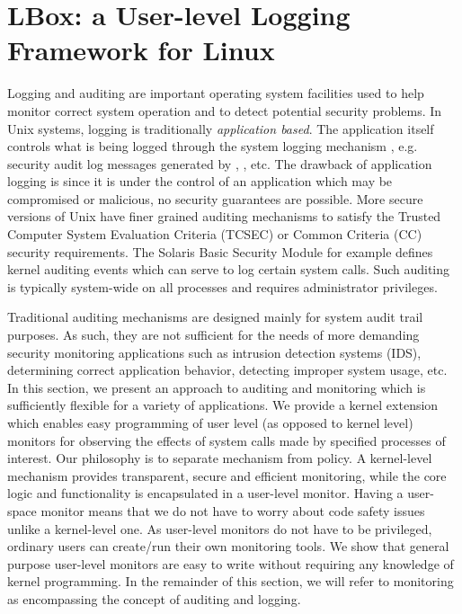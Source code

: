 \section{LBox: a User-level Logging Framework for Linux}
\label{sec:lbox}


Logging and auditing are important operating system facilities used
to help monitor correct system operation and to detect potential
security problems.
In Unix systems, logging is traditionally {\em application based}.
The application itself controls what is being logged through
the system logging mechanism , e.g.
security audit log messages generated 
by , , etc.
The drawback of application logging is since it is under the
control of an application which may be compromised or malicious,
no security guarantees are possible.
More secure versions of Unix have finer grained auditing mechanisms
to satisfy the Trusted Computer System Evaluation Criteria (TCSEC) or Common
Criteria (CC) security requirements.
The Solaris Basic Security Module \cite{solaris-sec-svc}
for example defines kernel auditing events 
which can serve to log certain system calls.
Such auditing is typically system-wide on all processes and
requires administrator privileges.

Traditional auditing mechanisms are designed mainly for
system audit trail purposes.
As such, they are not sufficient for the needs
of more demanding security monitoring applications
such as intrusion detection systems (IDS), 
determining correct application behavior, detecting improper system usage, etc.
In this section, we present an approach to auditing and monitoring
which is sufficiently flexible for a variety of applications.
We provide a kernel extension which enables easy
programming of user level (as opposed to kernel level) monitors for 
observing the effects of system calls made by specified processes of interest.
Our philosophy is to separate mechanism from policy.
A kernel-level mechanism provides transparent, secure and efficient monitoring,
while the core logic and functionality is encapsulated in a user-level monitor.
Having a user-space monitor means that
we do not have to worry about code safety
issues unlike a kernel-level one.
As user-level monitors do not have to be privileged, 
ordinary users can create/run their own monitoring tools.
We show that general purpose user-level monitors are easy to write 
without requiring any knowledge of kernel programming. 
In the remainder of this section, we will refer to monitoring as encompassing
the concept of auditing and logging.

